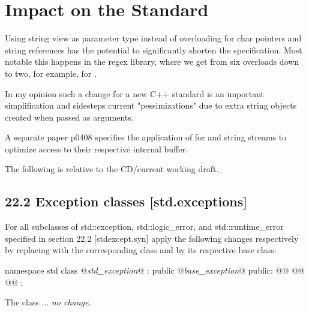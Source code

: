 \documentclass[ebook,11pt,article]{memoir}
\begin{document}


\chapter{Impact on the Standard}
Using string view as parameter type instead of overloading for char pointers and string references has the potential to significantly shorten the specification. Most notable this happens in the regex library, where we get from six overloads down to two, for example, for .

In my opinion such a change for a new C++ standard is an important simplification and sidesteps current "pessimizations" due to extra string objects created when passed as arguments.

A separate paper p0408 specifies the application of  for  and string streams to optimize access to their respective internal buffer.


The following is relative to the CD/current working draft.

\section{22.2 {Exception classes} [std.exceptions]}
For all subclasses of std::exception, std::logic_error, and std::runtime_error specified in section 22.2 [stdexcept.syn] apply the following changes respectively by replacing \emph{} with the corresponding class and \emph{} by its respective base class:


\begin{codeblock}
namespace std {
  class @\emph{std_exception}@ : public @\emph{base_exception}@ {
  public:
    @@
    @@
    @@
  };
}
\end{codeblock}

\pnum
The class
\emph{} ... \emph{no change}.
\end{document}
